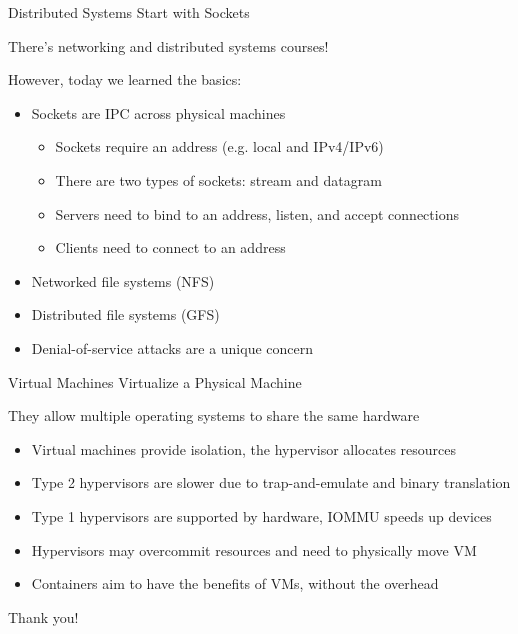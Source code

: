   \begin{frame}{Distributed Systems Start with Sockets}

    There's networking and distributed systems courses!

    \vspace{2em}

    However, today we learned the basics:

    \begin{itemize}
      \item Sockets are IPC across physical machines
        \begin{itemize}
          \item Sockets require an address (e.g. local and IPv4/IPv6)
          \item There are two types of sockets: stream and datagram
          \item Servers need to bind to an address, listen, and accept connections
          \item Clients need to connect to an address
        \end{itemize}
      \item Networked file systems (NFS)
      \item Distributed file systems (GFS)
      \item Denial-of-service attacks are a unique concern
    \end{itemize}
  \end{frame}

  \begin{frame}{Virtual Machines Virtualize a Physical Machine}

    They allow multiple operating systems to share the same hardware
    \begin{itemize}
      \item Virtual machines provide isolation, the hypervisor allocates
            resources
      \item Type 2 hypervisors are slower due to trap-and-emulate and binary
            translation
      \item Type 1 hypervisors are supported by hardware, IOMMU speeds up devices
      \item Hypervisors may overcommit resources and need to physically move VM
      \item Containers aim to have the benefits of VMs, without the overhead
    \end{itemize}
  \end{frame}

  \begin{frame}

    \Huge Thank you!
  
  \end{frame}

